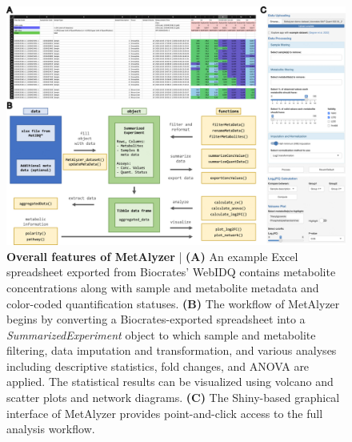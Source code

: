 \documentclass[12pt, a4paper]{article}
\begin{document}
\begin{figure}[h!]
    \centering
    \captionsetup{width=1.02\linewidth}
    \hspace{-6mm} \includegraphics[scale=1.1]{figure1.png}
    \caption{\textbf{Overall features of MetAlyzer} | \textbf{(A)} An example Excel spreadsheet exported from Biocrates' WebIDQ contains metabolite concentrations along with sample and metabolite metadata and color-coded quantification statuses. \textbf{(B)} The workflow of MetAlyzer begins by converting a Biocrates-exported spreadsheet into a \textit{SummarizedExperiment} object to which sample and metabolite filtering, data imputation and transformation, and various analyses including descriptive statistics, fold changes, and ANOVA are applied. The statistical results can be visualized using volcano and scatter plots and network diagrams. \textbf{(C)} The Shiny-based graphical interface of MetAlyzer provides point-and-click access to the full analysis workflow.}
    \label{fig:overallFeatures}
\end{figure}
\end{document}
